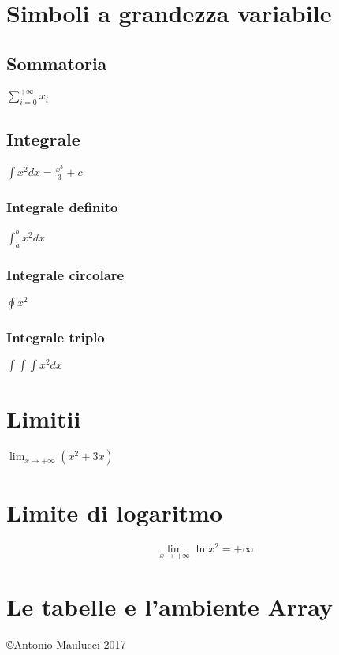 \documentclass{article}
\begin{document}
\section{Simboli a grandezza variabile}

\subsection{Sommatoria}

$
\sum_{i=0}^{+\infty} x_i
$

\subsection{Integrale}

$
\int x^2 dx = \frac{x^3}{3} + c
$

\subsubsection{Integrale definito}
$
\int_a^b x^2 dx
$

\subsubsection{Integrale circolare}
$
\oint x^2
$

\subsubsection{Integrale triplo}
$ \int \!\!\!\! \int \!\!\!\! \int x^2 dx $


\section{Limitii}

$
\lim_{x \rightarrow +\infty} (x^2+3x)
$

\section{Limite di logaritmo}

$$
\lim_{x \rightarrow +\infty} \ln x^2 = +\infty
$$

\section{Le tabelle e l'ambiente Array}



\vspace{6cm}
\begin{center}
\copyright Antonio Maulucci 2017
\end{center}
\end{document}
